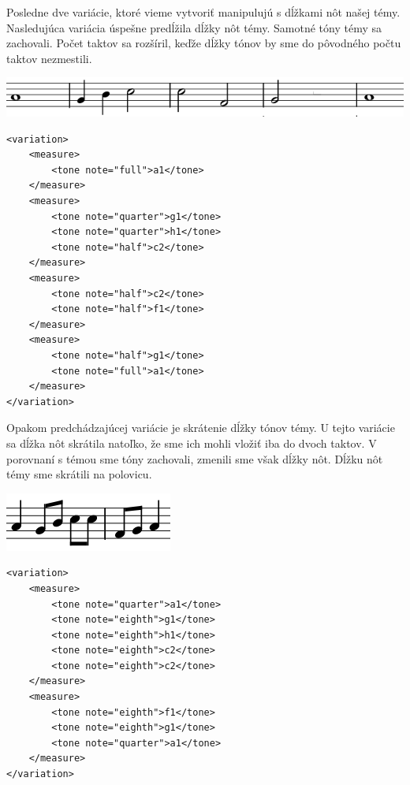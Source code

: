 Posledne dve variácie, ktoré vieme vytvoriť manipulujú s dĺžkami nôt našej témy. Nasledujúca variácia úspešne predĺžila dĺžky nôt témy. Samotné tóny témy sa zachovali. Počet taktov sa rozšíril, keďže dĺžky tónov by sme do pôvodného počtu taktov nezmestili.

\begin{minipage}{.46\textwidth}
\includegraphics[width=\textwidth]{thesis/obrazky-figures/var8.png}
\end{minipage}%
\begin{minipage}{.5\textwidth}
\centering
\lstset{language=XML}
\begin{lstlisting}[basicstyle=\tiny]
<variation>
    <measure>
        <tone note="full">a1</tone>
    </measure>
    <measure>
        <tone note="quarter">g1</tone>
        <tone note="quarter">h1</tone>
        <tone note="half">c2</tone>
    </measure>
    <measure>
        <tone note="half">c2</tone>
        <tone note="half">f1</tone>
    </measure>
    <measure>
        <tone note="half">g1</tone>
        <tone note="full">a1</tone>
    </measure>
</variation>
\end{lstlisting}
\end{minipage}

Opakom predchádzajúcej variácie je skrátenie dĺžky tónov témy. U tejto variácie sa dĺžka nôt skrátila natoľko, že sme ich mohli vložiť iba do dvoch taktov. V porovnaní s témou sme tóny zachovali, zmenili sme však dĺžky nôt. Dĺžku nôt témy sme skrátili na polovicu.

\begin{minipage}{.45\textwidth}
\includegraphics[width=\textwidth]{thesis/obrazky-figures/var9.png}
\end{minipage}%
\begin{minipage}{.5\textwidth}
\centering
\lstset{language=XML}
\begin{lstlisting}[basicstyle=\tiny]
<variation>
    <measure>
        <tone note="quarter">a1</tone>
        <tone note="eighth">g1</tone>
        <tone note="eighth">h1</tone>
        <tone note="eighth">c2</tone>
        <tone note="eighth">c2</tone>
    </measure>
    <measure>
        <tone note="eighth">f1</tone>
        <tone note="eighth">g1</tone>
        <tone note="quarter">a1</tone>
    </measure>
</variation>
\end{lstlisting}
\end{minipage}

